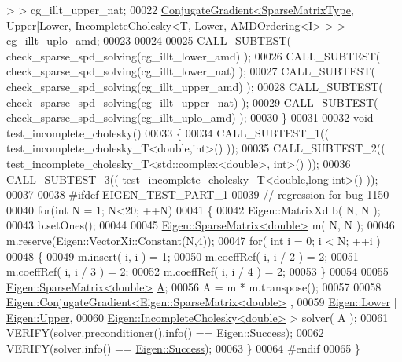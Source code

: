 \begin{DoxyCode}
       > >    cg\_illt\_upper\_nat;
00022   
      \hyperlink{group___iterative_linear_solvers___module_class_eigen_1_1_conjugate_gradient}{ConjugateGradient<SparseMatrixType, Upper|Lower, IncompleteCholesky<T, Lower, AMDOrdering<I>}
       > >  cg\_illt\_uplo\_amd;
00023   
00024 
00025   CALL\_SUBTEST( check\_sparse\_spd\_solving(cg\_illt\_lower\_amd) );
00026   CALL\_SUBTEST( check\_sparse\_spd\_solving(cg\_illt\_lower\_nat) );
00027   CALL\_SUBTEST( check\_sparse\_spd\_solving(cg\_illt\_upper\_amd) );
00028   CALL\_SUBTEST( check\_sparse\_spd\_solving(cg\_illt\_upper\_nat) );
00029   CALL\_SUBTEST( check\_sparse\_spd\_solving(cg\_illt\_uplo\_amd) );
00030 \}
00031 
00032 \textcolor{keywordtype}{void} test\_incomplete\_cholesky()
00033 \{
00034   CALL\_SUBTEST\_1(( test\_incomplete\_cholesky\_T<double,int>() ));
00035   CALL\_SUBTEST\_2(( test\_incomplete\_cholesky\_T<std::complex<double>, \textcolor{keywordtype}{int}>() ));
00036   CALL\_SUBTEST\_3(( test\_incomplete\_cholesky\_T<double,long int>() ));
00037 
00038 \textcolor{preprocessor}{#ifdef EIGEN\_TEST\_PART\_1}
00039     \textcolor{comment}{// regression for bug 1150}
00040   \textcolor{keywordflow}{for}(\textcolor{keywordtype}{int} N = 1; N<20; ++N)
00041   \{
00042     Eigen::MatrixXd b( N, N );
00043     b.setOnes();
00044 
00045     \hyperlink{group___sparse_core___module}{Eigen::SparseMatrix<double>} m( N, N );
00046     m.reserve(Eigen::VectorXi::Constant(N,4));
00047     \textcolor{keywordflow}{for}( \textcolor{keywordtype}{int} i = 0; i < N; ++i )
00048     \{
00049         m.insert( i, i ) = 1;
00050         m.coeffRef( i, i / 2 ) = 2;
00051         m.coeffRef( i, i / 3 ) = 2;
00052         m.coeffRef( i, i / 4 ) = 2;
00053     \}
00054 
00055     \hyperlink{group___sparse_core___module}{Eigen::SparseMatrix<double>} \hyperlink{group___core___module_class_eigen_1_1_matrix}{A};
00056     A = m * m.transpose();
00057 
00058     \hyperlink{group___iterative_linear_solvers___module_class_eigen_1_1_conjugate_gradient}{Eigen::ConjugateGradient<Eigen::SparseMatrix<double>}
      ,
00059         \hyperlink{group__enums_gga39e3366ff5554d731e7dc8bb642f83cda891792b8ed394f7607ab16dd716f60e6}{Eigen::Lower} | \hyperlink{group__enums_gga39e3366ff5554d731e7dc8bb642f83cda6bcb58be3b8b8ec84859ce0c5ac0aaec}{Eigen::Upper},
00060         \hyperlink{class_eigen_1_1_incomplete_cholesky}{Eigen::IncompleteCholesky<double>} > solver( A );
00061     VERIFY(solver.preconditioner().info() == \hyperlink{group__enums_gga85fad7b87587764e5cf6b513a9e0ee5ea52581b035f4b59c203b8ff999ef5fcea}{Eigen::Success});
00062     VERIFY(solver.info() == \hyperlink{group__enums_gga85fad7b87587764e5cf6b513a9e0ee5ea52581b035f4b59c203b8ff999ef5fcea}{Eigen::Success});
00063   \}
00064 \textcolor{preprocessor}{#endif}
00065 \}
\end{DoxyCode}
